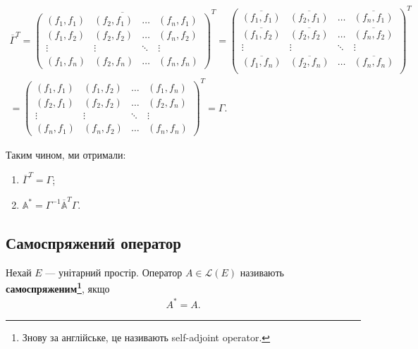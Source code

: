 \documentclass{math_library}
\begin{document}
\begin{align*}
\overline{\Gamma}^T = \overline{\begin{pmatrix}
(f_1,f_1) & (f_2,f_1) & \dots & (f_n,f_1) \\
(f_1,f_2) & (f_2,f_2) & \dots & (f_n,f_2) \\
\vdots & \vdots & \ddots & \vdots \\
(f_1,f_n) & (f_2,f_n) & \dots & (f_n,f_n)
\end{pmatrix}}^T = \begin{pmatrix}
\overline{(f_1,f_1)} & \overline{(f_2,f_1)} & \dots & \overline{(f_n,f_1)} \\
\overline{(f_1,f_2)} & \overline{(f_2,f_2)} & \dots & \overline{(f_n,f_2)} \\
\vdots & \vdots & \ddots & \vdots \\
\overline{(f_1,f_n)} & \overline{(f_2,f_n)} & \dots & \overline{(f_n,f_n)} \\
\end{pmatrix}^T \\ = \begin{pmatrix}
(f_1,f_1) & (f_1,f_2) & \dots & (f_1,f_n) \\
(f_2,f_1) & (f_2,f_2) & \dots & (f_2,f_n) \\
\vdots & \vdots & \ddots & \vdots \\
(f_n,f_1) & (f_n,f_2) & \dots & (f_n,f_n)
\end{pmatrix}^T = \Gamma.
\end{align*}

\begin{proposition}
Таким чином, ми отримали:
\begin{enumerate}[nosep,wide=0pt,label={\arabic*)}]
\item  $\overline{\Gamma}^T = \Gamma$;
\item $\mathbb{A^*} = \Gamma^{-1} \mathbb{\overline{A}}^T \Gamma$.
\end{enumerate}
\end{proposition}

\subsection{Самоспряжений оператор}
\begin{definition}
Нехай $E$ --- унітарний простір. Оператор $A \in \mathcal{L}(E)$ називають \textbf{самоспряженим\footnote{Знову за англійське, це називають self-adjoint operator.}}, якщо
\begin{align*}
A^* = A.
\end{align*}
\end{definition}
\end{document}

